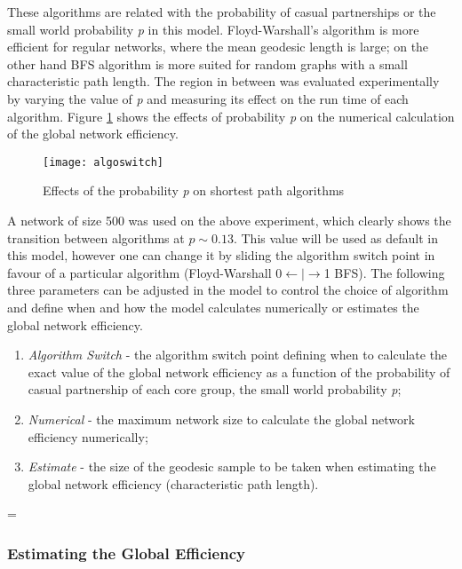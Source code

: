 These algorithms are related with the probability of casual partnerships or the small
world probability \emph{p} in this model. Floyd-Warshall's algorithm is more efficient
for regular networks, where the mean geodesic length is large; on the other hand BFS
algorithm is more suited for random graphs with a small characteristic path length. The
region in between was evaluated experimentally by varying the value of \emph{p} and
measuring its effect on the run time of each algorithm. Figure \ref{algoswitch} shows the
effects of probability \emph{p} on the numerical calculation of the global network
efficiency.
\begin{figure}[h]
\begin{center}
\texttt{[image: algoswitch]}
\caption{Effects of the probability \emph{p} on shortest path algorithms}
\label{algoswitch}
\end{center}
\end{figure}

A network of size 500 was used on the above experiment, which clearly shows the
transition between algorithms at $p \sim 0.13$. This value will be used as default in
this model, however one can change it by sliding the algorithm switch point in favour of
a particular algorithm (Floyd-Warshall 0$\leftarrow\mid\longrightarrow$1 BFS). The
following three parameters can be adjusted in the model to control the choice of
algorithm and define when and how the model calculates numerically or estimates the
global network efficiency.
\parskip=0pt
\begin{enumerate}
    \item \emph{Algorithm Switch} - the algorithm switch point defining when to calculate
    the exact value of the global network efficiency as a function of the probability of
    casual partnership of each core group, the small world probability \emph{p};
    \item \emph{Numerical} - the maximum network size to calculate the global
    network efficiency numerically;
    \item \emph{Estimate} - the size of the geodesic sample to be taken when
    estimating the global network efficiency (characteristic path length).
\end{enumerate}
\parskip=\baselineskip

\subsubsection{Estimating the Global Efficiency}

